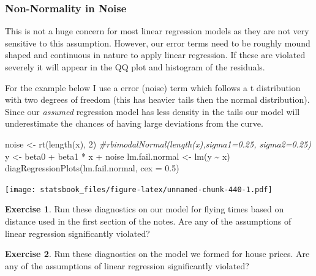 \documentclass[
]{book}
\newenvironment{Shaded}{\begin{snugshade}}{\end{snugshade}}
\newcommand{\AttributeTok}[1]{\textcolor[rgb]{0.77,0.63,0.00}{#1}}
\newcommand{\CommentTok}[1]{\textcolor[rgb]{0.56,0.35,0.01}{\textit{#1}}}
\newcommand{\DecValTok}[1]{\textcolor[rgb]{0.00,0.00,0.81}{#1}}
\newcommand{\FloatTok}[1]{\textcolor[rgb]{0.00,0.00,0.81}{#1}}
\newcommand{\FunctionTok}[1]{\textcolor[rgb]{0.00,0.00,0.00}{#1}}
\newcommand{\NormalTok}[1]{#1}
\newcommand{\OtherTok}[1]{\textcolor[rgb]{0.56,0.35,0.01}{#1}}
\newcommand{\SpecialCharTok}[1]{\textcolor[rgb]{0.00,0.00,0.00}{#1}}
\theoremstyle{definition}
\theoremstyle{definition}
\theoremstyle{definition}
\newtheorem{exercise}{Exercise}[chapter]
\theoremstyle{definition}
\theoremstyle{remark}
\begin{document}
\hypertarget{non-normality-in-noise}{%
\subsubsection{Non-Normality in Noise}\label{non-normality-in-noise}}

This is not a huge concern for most linear regression models as they are not very sensitive to this assumption. However, our error terms need to be roughly mound shaped and continuous in nature to apply linear regression. If these are violated severely it will appear in the QQ plot and histogram of the residuals.

For the example below I use a error (noise) term which follows a t distribution with two degrees of freedom (this has heavier tails then the normal distribution). Since our \emph{assumed} regression model has less density in the tails our model will underestimate the chances of having large deviations from the curve.

\begin{Shaded}
\begin{Highlighting}[]
\NormalTok{noise }\OtherTok{\textless{}{-}} \FunctionTok{rt}\NormalTok{(}\FunctionTok{length}\NormalTok{(x), }\DecValTok{2}\NormalTok{)  }\CommentTok{\#rbimodalNormal(length(x),sigma1=0.25, sigma2=0.25)}
\NormalTok{y }\OtherTok{\textless{}{-}}\NormalTok{ beta0 }\SpecialCharTok{+}\NormalTok{ beta1 }\SpecialCharTok{*}\NormalTok{ x }\SpecialCharTok{+}\NormalTok{ noise}
\NormalTok{lm.fail.normal }\OtherTok{\textless{}{-}} \FunctionTok{lm}\NormalTok{(y }\SpecialCharTok{\textasciitilde{}}\NormalTok{ x)}
\FunctionTok{diagRegressionPlots}\NormalTok{(lm.fail.normal, }\AttributeTok{cex =} \FloatTok{0.5}\NormalTok{)}
\end{Highlighting}
\end{Shaded}

\texttt{[image: statsbook\_files/figure-latex/unnamed-chunk-440-1.pdf]}

\begin{exercise}
\protect\hypertarget{exr:unnamed-chunk-441}{}\label{exr:unnamed-chunk-441}Run these diagnostics on our model for flying times based on distance used in the first section of the notes. Are any of the assumptions of linear regression significantly violated?
\end{exercise}

\begin{exercise}
\protect\hypertarget{exr:unnamed-chunk-442}{}\label{exr:unnamed-chunk-442}Run these diagnostics on the model we formed for house prices. Are any of the assumptions of linear regression significantly violated?
\end{exercise}
\end{document}
